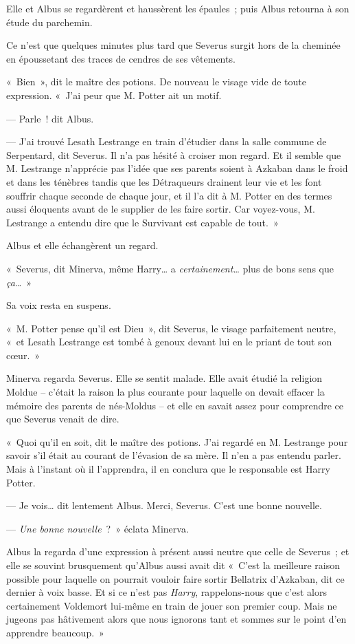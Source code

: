 Elle et Albus se regardèrent et haussèrent les épaules~; puis Albus retourna à son étude du parchemin.

Ce n'est que quelques minutes plus tard que Severus surgit hors de la cheminée en époussetant des traces de cendres de ses vêtements.

«~Bien~», dit le maître des potions.
De nouveau le visage vide de toute expression.
«~J'ai peur que M. Potter ait un motif.

--- Parle~! dit Albus.

--- J'ai trouvé Lesath Lestrange en train d'étudier dans la salle commune de Serpentard, dit Severus.
Il n'a pas hésité à croiser mon regard.
Et il semble que M. Lestrange n'apprécie pas l'idée que ses parents soient à Azkaban dans le froid et dans les ténèbres tandis que les Détraqueurs drainent leur vie et les font souffrir chaque seconde de chaque jour, et il l'a dit à M. Potter en des termes aussi éloquents avant de le supplier de les faire sortir.
Car voyez-vous, M. Lestrange a entendu dire que le Survivant est capable de tout.~»

Albus et elle échangèrent un regard.

«~Severus, dit Minerva, même Harry… a \emph{certainement}… plus de bons sens que \emph{ça}…~»

Sa voix resta en suspens.

«~M. Potter pense qu'il est Dieu~», dit Severus, le visage parfaitement neutre, «~et Lesath Lestrange est tombé à genoux devant lui en le priant de tout son cœur.~»

Minerva regarda Severus.
Elle se sentit malade.
Elle avait étudié la religion Moldue -- c'était la raison la plus courante pour laquelle on devait effacer la mémoire des parents de nés-Moldus -- et elle en savait assez pour comprendre ce que Severus venait de dire.

«~Quoi qu'il en soit, dit le maître des potions.
J'ai regardé en M. Lestrange pour savoir s'il était au courant de l'évasion de sa mère.
Il n'en a pas entendu parler.
Mais à l'instant où il l'apprendra, il en conclura que le responsable est Harry Potter.

--- Je vois… dit lentement Albus.
Merci, Severus.
C'est une bonne nouvelle.

--- \emph{Une bonne nouvelle}~?~»
éclata Minerva.

Albus la regarda d'une expression à présent aussi neutre que celle de Severus~; et elle se souvint brusquement qu'Albus aussi avait dit «~C'est la meilleure raison possible pour laquelle on pourrait vouloir faire sortir Bellatrix d'Azkaban, dit ce dernier à voix basse.
Et si ce n'est pas \emph{Harry}, rappelons-nous que c'est alors certainement Voldemort lui-même en train de jouer son premier coup.
Mais ne jugeons pas hâtivement alors que nous ignorons tant et sommes sur le point d'en apprendre beaucoup.~»

